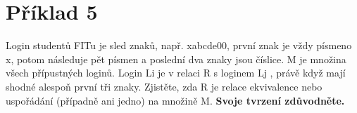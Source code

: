 \section*{Příklad 5}
Login studentů FITu je sled znaků, např. xabcde00, první znak je vždy písmeno x, potom následuje
pět písmen a poslední dva znaky jsou číslice. M je množina všech přípustných loginů. Login Li je
v relaci R s loginem Lj , právě když mají shodné alespoň první tři znaky. Zjistěte, zda R je relace
ekvivalence nebo uspořádání (případně ani jedno) na množině M. \textbf{Svoje tvrzení zdůvodněte.}
